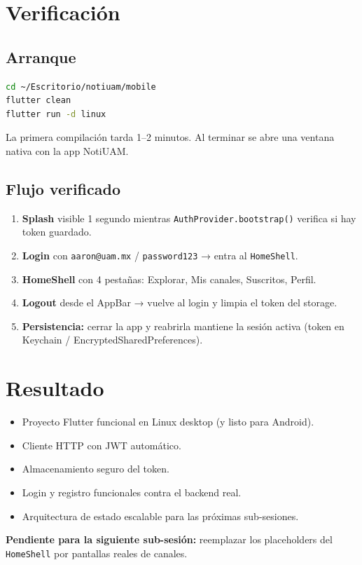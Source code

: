 \section{Verificación}

\subsection{Arranque}

\begin{lstlisting}[language=bash]
cd ~/Escritorio/notiuam/mobile
flutter clean
flutter run -d linux
\end{lstlisting}

La primera compilación tarda 1--2 minutos. Al terminar se abre una ventana nativa con la app NotiUAM.

\subsection{Flujo verificado}

\begin{enumerate}[leftmargin=*]
  \item \textbf{Splash} visible 1 segundo mientras \texttt{AuthProvider.bootstrap()} verifica si hay token guardado.
  \item \textbf{Login} con \texttt{aaron@uam.mx} / \texttt{password123} → entra al \texttt{HomeShell}.
  \item \textbf{HomeShell} con 4 pestañas: Explorar, Mis canales, Suscritos, Perfil.
  \item \textbf{Logout} desde el AppBar → vuelve al login y limpia el token del storage.
  \item \textbf{Persistencia:} cerrar la app y reabrirla mantiene la sesión activa (token en Keychain / EncryptedSharedPreferences).
\end{enumerate}

\section{Resultado}

\begin{exito}
\begin{itemize}[leftmargin=*]
  \item Proyecto Flutter funcional en Linux desktop (y listo para Android).
  \item Cliente HTTP con JWT automático.
  \item Almacenamiento seguro del token.
  \item Login y registro funcionales contra el backend real.
  \item Arquitectura de estado escalable para las próximas sub-sesiones.
\end{itemize}
\end{exito}

\textbf{Pendiente para la siguiente sub-sesión:} reemplazar los placeholders del \texttt{HomeShell} por pantallas reales de canales.